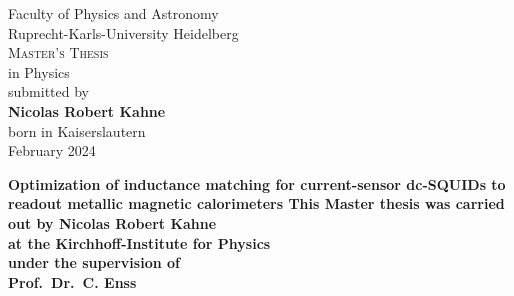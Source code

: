 \begin{titlepage}
	
	\thispagestyle{empty}
	\linespread{1.6}     %
	\large
	\begin{center}
		{\Huge Faculty of Physics and Astronomy}\\
		{\LARGE Ruprecht-Karls-University Heidelberg}\\
		\vspace{2cm}
		\vfill
		\linespread{1.3}
		\textsc{Master's Thesis}\\ 
		\vspace{-0.2cm}
		in Physics \\
		\bigskip
		submitted by\\
		\vspace{-0.2cm}
		\textbf{Nicolas Robert Kahne}\\
		\vspace{-0.2cm}
		born in Kaiserslautern\\
		\bigskip
		February 2024
	\end{center}
\end{titlepage}


\begin{titlepage}
	\thispagestyle{empty}
	\linespread{1.3}     %
	\begin{center}
		\bf
		\Large
		Optimization of inductance matching for current-sensor dc-SQUIDs to readout metallic magnetic calorimeters
		\rm	
		\large
		\vfill
		This Master thesis was carried out by Nicolas Robert Kahne \\
		at the Kirchhoff-Institute for Physics\\
		under the supervision of\\
		\textbf{Prof.\ Dr.\ C. Enss}
	\end{center}
\end{titlepage}



